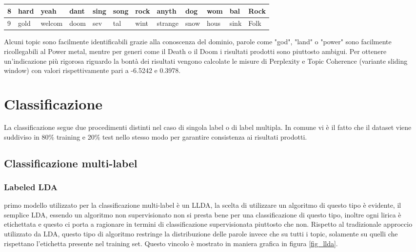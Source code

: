 \documentclass[technote]{IEEEtran}
\begin{document}
\begin{table}[H]
{\begin{tabular}{|l||llllllllll||l|}
8        & hard                  & yeah                  & dant                  & sing                  & song                  & rock                  & anyth                 & dog                   & wom                   & bal  & Rock            \\ \hline
9        & gold                  & welcom                & doom                  & sev                   & tal                   & wint                  & strange               & snow                  & hous                  & sink & Folk            \\ \hline
\end{tabular}
}
\label{t_topic_label}
\end{table}
Alcuni topic sono facilmente identificabili grazie alla conoscenza del dominio, parole come "god", "land" o "power" sono facilmente ricollegabili al Power metal, mentre per generi come il Death o il Doom i risultati prodotti sono piuttosto ambigui. Per ottenere un'indicazione più rigorosa riguardo la bontà dei risultati vengono calcolate le misure di Perplexity e Topic Coherence (variante sliding window) con valori rispettivamente pari a -6.5242 e 0.3978.
\section{Classificazione}
La classificazione segue due procedimenti distinti nel caso di singola label o di label multipla. In comune vi è il fatto che il dataset viene suddiviso in 80\% training e 20\% test nello stesso modo per garantire consistenza ai risultati prodotti.
\subsection{Classificazione multi-label}
\subsubsection{Labeled LDA}
\Il primo modello utilizzato per la classificazione multi-label è un LLDA, la scelta di utilizzare un algoritmo di questo tipo è evidente, il semplice LDA, essendo un algoritmo non supervisionato non si presta bene per una classificazione di questo tipo, inoltre ogni lirica è etichettata e questo ci porta a ragionare in termini di classificazione supervisionata piuttosto che non. Rispetto al tradizionale approccio utilizzato da LDA, questo tipo di algoritmo restringe la distribuzione delle parole invece che su tutti i topic, solamente su quelli che rispettano l'etichetta presente nel training set. Questo vincolo è mostrato in maniera grafica in figura \ref{fig_llda}.
\end{document}
